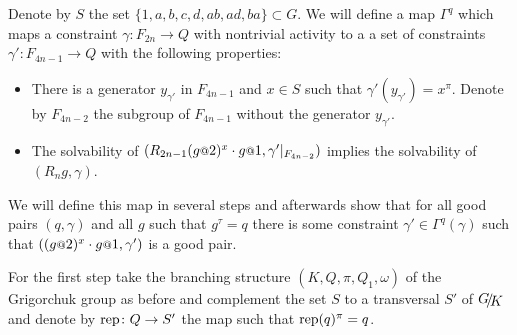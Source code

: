 \documentclass[a4paper,12pt]{article}
\begin{document}
Denote by $S$ the set $\{1,a,b,c,d,ab,ad,ba\}\subset G$.
We will define a map $\Gamma^q$ which maps a constraint $\gamma\colon F_{2n} \to Q$ with nontrivial activity to a a set of constraints $\gamma'\colon F_{4n-1}\to Q$ 
with the following properties:
\begin{itemize}
  \item There is a generator $y_{\gamma'}$ in $F_{4n-1}$ and $x\in S$ such that $\gamma'(y_{\gamma'})=x^\pi$. Denote by $F_{4n-2}$ the subgroup of $F_{4n-1}$ without the generator $y_{\gamma'}$.
  \item The solvability of $(R_{2n-1} (g\at{2})^x \cdot g\at{1},\gamma'|_{F_{4n-2}})$ implies
  the solvability of $(R_ng,\gamma)$.
 \end{itemize}

 We will define this map in several steps and afterwards show that for all good pairs $(q,\gamma)$ and all $g$ such that $g^\tau=q$ 
 there is some constraint $\gamma' \in \Gamma^q(\gamma)$ such that $((g\at{2})^x \cdot g\at{1},\gamma')$ is a good pair.
 
 For the first step take the branching structure $(K,Q,\pi,Q_1,\omega)$ of the Grigorchuk group as before and 
 complement the set $S$ to a transversal $S'$ of $\RNK{G}{K}$ and denote by $\textup{rep}\colon Q\to S'$ 
 the map such that $\textup{rep}(q)^\pi = q$.
 
\end{document}
